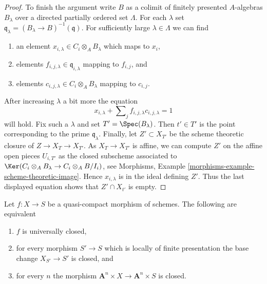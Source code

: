 \begin{proof}
\medskip\noindent
To finish the argument write $B$ as a colimit of finitely presented
$A$-algebras $B_\lambda$ over a directed partially ordered set $\Lambda$.
For each $\lambda$ set
$\mathfrak q_\lambda = (B_\lambda \to B)^{-1}(\mathfrak q)$.
For sufficiently large $\lambda \in \Lambda$ we can find
\begin{enumerate}
\item an element
$x_{i, \lambda} \in C_i \otimes_A B_\lambda$ which maps to $x_i$,
\item elements $f_{i, j, \lambda} \in \mathfrak q_{i, \lambda}$
mapping to $f_{i, j}$, and
\item elements $c_{i, j, \lambda} \in C_i \otimes_A B_\lambda$
mapping to $c_{i, j}$.
\end{enumerate}
After increasing $\lambda$ a bit more the equation
$$
x_{i, \lambda} + \sum\nolimits_j f_{i, j, \lambda}c_{i, j, \lambda} = 1
$$
will hold. Fix such a $\lambda$ and set $T' = \Spec(B_\lambda)$.
Then $t' \in T'$ is the point corresponding to the prime $\mathfrak q_\lambda$.
Finally, let $Z' \subset X_{T'}$ be the scheme theoretic closure of
$Z \to X_T \to X_{T'}$. As $X_T \to X_{T'}$ is affine, we can compute $Z'$
on the affine open pieces $U_{i, T'}$ as the closed subscheme associated
to $\Ker(C_i \otimes_A B_\lambda \to C_i \otimes_A B/I_i)$, see
Morphisms, Example \ref{morphisms-example-scheme-theoretic-image}.
Hence $x_{i, \lambda}$ is in the ideal defining $Z'$. Thus the last
displayed equation shows that $Z' \cap X_{t'}$ is empty.
\end{proof}

\begin{lemma}
\label{lemma-test-universally-closed}
Let $f : X \to S$ be a quasi-compact morphism of schemes.
The following are equivalent
\begin{enumerate}
\item $f$ is universally closed,
\item for every morphism $S' \to S$ which is locally of finite presentation
the base change $X_{S'} \to S'$ is closed, and
\item for every $n$ the morphism
$\mathbf{A}^n \times X \to \mathbf{A}^n \times S$
is closed.
\end{enumerate}
\end{lemma}

